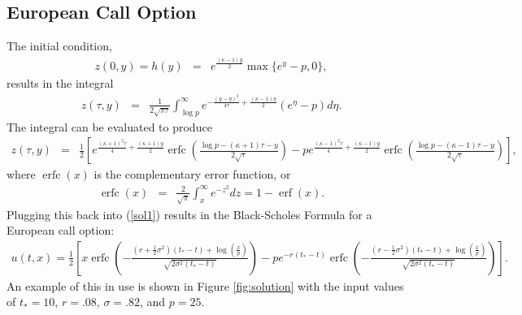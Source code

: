 \documentclass{article}
\DeclareMathOperator\erfc{erfc}
\DeclareMathOperator\erf{erf}
\newcommand{\bea}{\begin{eqnarray*}}
\newcommand{\eea}{\end{eqnarray*}}
\begin{document}
\subsection{European Call Option}
The initial condition,\\
\bea
z(0,y) = h(y) &=& e^{\frac{(\kappa-1)y}{2}}\max\{e^y-p, 0\},
\eea
results in the integral
\bea
z(\tau,y) &=& \frac{1}{2\sqrt{\pi\tau}}\int_{\log{p}}^{\infty}{e^{-\frac{(y-\eta)^2}{4\tau}+\frac{(\kappa-1)\eta}{2}}(e^\eta-p)d\eta}.
\eea
The integral can be evaluated to produce
\bea
z(\tau,y) &=& \frac{1}{2}\left[e^{\frac{(\kappa+1)^2\tau}{4}+\frac{(\kappa+1)y}{2}}\erfc\left(\frac{\log{p}-(\kappa+1)\tau-y}{2\sqrt{\tau}}\right)-pe^{\frac{(\kappa-1)^2\tau}{4}+\frac{(\kappa-1)y}{2}}\erfc\left(\frac{\log{p}-(\kappa-1)\tau-y}{2\sqrt{\tau}}\right)\right],
\eea
where $\erfc(x)$ is the complementary error function, or
\bea
\erfc(x) &=& \frac{2}{\sqrt{\pi}}\int_{x}^{\infty}{e^{-z^2}dz} = 1-\erf(x).
\eea
Plugging this back into (\ref{sol1}) results in the Black-Scholes Formula for a European call option:\\
\bea\boxed{
u(t,x) = \frac{1}{2}\left[x\erfc\left(-\frac{(r+\frac{1}{2}\sigma^2)(t_*-t)+\log(\frac{x}{p})}{\sqrt{2\sigma^2(t_*-t)}}\right)-pe^{-r(t_*-t)}\erfc\left(-\frac{(r-\frac{1}{2}\sigma^2)(t_*-t)+\log(\frac{x}{p})}{\sqrt{2\sigma^2(t_*-t)}}\right)\right].
}
\eea
An example of this in use is shown in Figure \ref{fig:solution} with the input values of $t_* = 10$, $r = .08$, $\sigma = .82$, and $p = 25$.\\
\end{document}
